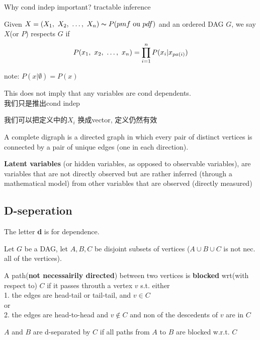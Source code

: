\documentclass{article}
\begin{document}
Why cond indep important?
tractable inference

\begin{definition}
Given $X = (X_1,~X_2,~\ldots,~X_n) \thicksim{P}(pmf \textrm{ ou } pdf)$ and an ordered DAG $G$, we say $X$(or $P$) respects $G$ if
$$P(x_1,~x_2,~\ldots,~x_n) = \prod_{i=1}^n P(x_i|x_{pa(i)})$$
\end{definition}
note: $P(x|\emptyset) = P(x)$

\begin{remark}
This does not imply that any variables are cond dependents.\\
我们只是推出cond indep
\end{remark}

\begin{remark}
我们可以把定义中的$X_i$ 换成vector, 定义仍然有效
\end{remark}

A complete digraph is a directed graph in which every pair of distinct vertices is connected by a pair of unique edges (one in each direction).

\textbf{Latent variables} (or hidden variables, as opposed to observable variables), are variables that are not directly observed 
but are rather inferred (through a mathematical model) from other variables that are observed (directly measured)

\subsection{D-seperation}
The letter \textbf{d} is for dependence.

Let $G$ be a DAG, let $A,B,C$ be disjoint subsets of vertices ($A \cup B \cup C$ is not nec. all of the vertices).

\begin{definition}
A path(\textbf{not necessairily directed}) between two vertices is \textbf{blocked} wrt(with respect to) $C$ if 
it passes throuth a vertex $v$ s.t. either\\
1. the edges are head-tail or tail-tail, and $v \in C$\\
or\\
2. the edges are head-to-head and $v \notin C$ and non of the descedents of $v$ are in $C$
\end{definition}

\begin{definition}
$A$ and $B$ are d-separated by $C$ if all paths from $A$ to $B$ are blocked w.r.t. $C$
\end{definition}
\end{document}
